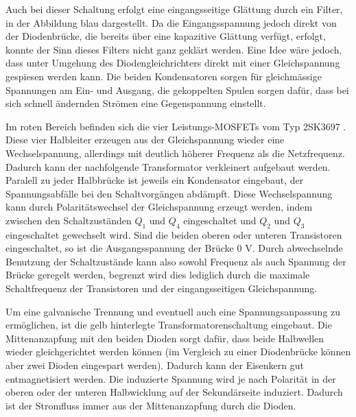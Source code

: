 Auch bei dieser Schaltung erfolgt eine eingangsseitige Glättung durch ein Filter, in der Abbildung blau dargestellt. Da die Eingangsspannung jedoch direkt von der Diodenbrücke, die bereits über eine kapazitive Glättung verfügt, erfolgt, konnte der Sinn dieses Filters nicht ganz geklärt werden. Eine Idee wäre jedoch, dass unter Umgehung des Diodengleichrichters direkt mit einer Gleichspannung gespiesen werden kann. Die beiden Kondensatoren sorgen für gleichmässige Spannungen am Ein- und Ausgang, die gekoppelten Spulen sorgen dafür, dass bei sich schnell ändernden Strömen eine Gegenspannung einstellt.

Im roten Bereich befinden sich die vier Leistungs-MOSFETs vom Typ 2SK3697 \cite{2sk3697}. Diese vier Halbleiter erzeugen aus der Gleichspannung wieder eine Wechselspannung, allerdings mit deutlich höherer Frequenz als die Netzfrequenz. Dadurch kann der nachfolgende Transformator verkleinert aufgebaut werden. Paralell zu jeder Halbbrücke ist jeweils ein Kondensator eingebaut, der Spannungsabfälle bei den Schaltvorgängen abdämpft. Diese Wechselspannung kann durch Polaritätswechsel der Gleichspannung erzeugt werden, indem zwischen den Schaltzuständen $Q_1$ und $Q_4$ eingeschaltet und $Q_2$ und $Q_3$ eingeschaltet gewechselt wird. Sind die beiden oberen oder unteren Transistoren eingeschaltet, so ist die Ausgangsspannung der Brücke $0$ V. Durch abwechselnde Benutzung der Schaltzustände kann also sowohl Frequenz als auch Spannung der Brücke geregelt werden, begrenzt wird dies lediglich durch die maximale Schaltfrequenz der Transistoren und der eingangsseitigen Gleichspannung.

Um eine galvanische Trennung und eventuell auch eine Spannungsanpassung zu ermöglichen, ist die gelb hinterlegte Transformatorenschaltung eingebaut. Die Mittenanzapfung mit den beiden Dioden sorgt dafür, dass beide Halbwellen wieder gleichgerichtet werden können (im Vergleich zu einer Diodenbrücke können aber zwei Dioden eingespart werden). Dadurch kann der Eisenkern gut entmagnetisiert werden. Die induzierte Spannung wird je nach Polarität in der oberen oder der unteren Halbwicklung auf der Sekundärseite induziert. Dadurch ist der Stromfluss immer aus der Mittenanzapfung durch die Dioden.

